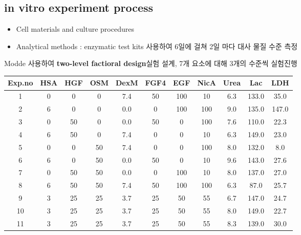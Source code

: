 \documentclass{article}
\begin{document}
\subsection{in vitro experiment process}
\begin{itemize}
    \item Cell materials and culture procedures
    \item Analytical methods : enzymatic test kits 사용하여 6일에 걸쳐 2일 마다 대사 물질 수준 측정
\end{itemize}
Modde 사용하여 \textbf{two-level factioral design}실험 설계, 7개 요소에 대해 3개의 수준씩 실험진행 
\begin{center}
    \begin{tabular}{||c | c c c c c c c | c c c||} 
     \hline
     Exp.no&  HSA & HGF & OSM  &DexM&  FGF4 & EGF & NicA  &Urea  &  Lac  &  LDH\\
     \hline\hline
     1&0&0&0&7.4&50&100&10&6.3&133.0&35.0\\
     2&6&0&0&0.0&0&100&100&9.0&135.0&147.0\\
     3&0&50&0&0.0&50&0&100&7.6&110.0&22.3\\
     4&6&50&0&7.4&0&0&10&6.3&149.0&23.0\\
     5&0&0&50&7.4&0&0&100&8.0&132.0&8.0\\
     6&6&0&50&0.0&50&0&10&9.6&143.0&27.6\\
     7&0&50&50&0.0&0&100&10&8.0&137.0&27.0\\
     8&6&50&50&7.4&50&100&100&6.3&87.0&25.7\\
     9&3&25&25&3.7&25&50&55&6.7&147.0&24.7\\
     10&3&25&25&3.7&25&50&55&8.0&149.0&22.7\\
     11&3&25&25&3.7&25&50&55&8.3&139.0&30.0\\
     \hline
    \end{tabular}
\end{center}
\end{document}
